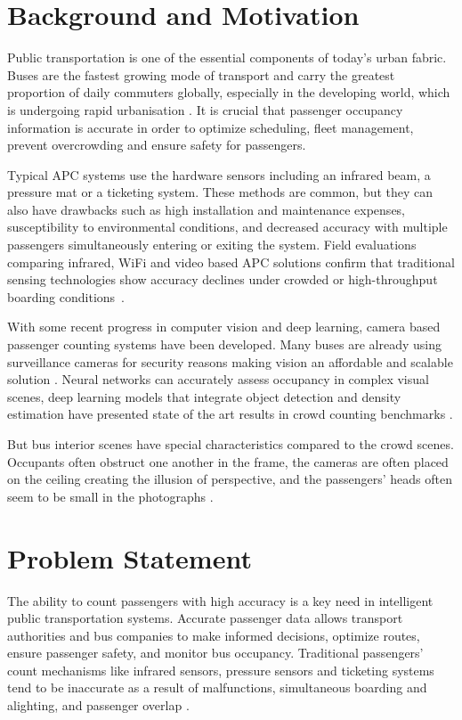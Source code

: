 
\section{Background and Motivation}

Public transportation is one of the essential components of today's urban fabric. Buses are the fastest growing mode of transport and carry the greatest proportion of daily commuters globally, especially in the developing world, which is undergoing rapid urbanisation \cite{itf_outlook_2023}. It is crucial that passenger occupancy information is accurate in order to optimize scheduling, fleet management, prevent overcrowding and ensure safety for passengers.

Typical APC systems use the hardware sensors including an infrared beam, a pressure mat or a ticketing system. These methods are common, but they can also have drawbacks such as high installation and maintenance expenses, susceptibility to environmental conditions, and decreased accuracy with multiple passengers simultaneously entering or exiting the system. Field evaluations comparing infrared, WiFi and video based APC solutions confirm that traditional sensing technologies show accuracy declines under crowded or high-throughput boarding conditions~\cite{grgurevic2021review}.

With some recent progress in computer vision and deep learning, camera based passenger counting systems have been developed. Many buses are already using surveillance cameras for security reasons making vision an affordable and scalable solution \cite{Chris2023}. Neural networks can accurately assess occupancy in complex visual scenes, deep learning models that integrate object detection and density estimation have presented state of the art results in crowd counting benchmarks \cite{gao2022caaisurvey}.

But bus interior scenes have special characteristics compared to the crowd scenes. Occupants often obstruct one another in the frame, the cameras are often placed on the ceiling creating the illusion of perspective, and the passengers' heads often seem to be small in the photographs \cite{tezcan2024fisheye}.

\section{Problem Statement}

The ability to count passengers with high accuracy is a key need in intelligent public transportation systems. Accurate passenger data allows transport authorities and bus companies to make informed decisions, optimize routes, ensure passenger safety, and monitor bus occupancy. Traditional passengers' count mechanisms like infrared sensors, pressure sensors and ticketing systems tend to be inaccurate as a result of malfunctions, simultaneous boarding and alighting, and passenger overlap \cite{Aleksander2024}.

